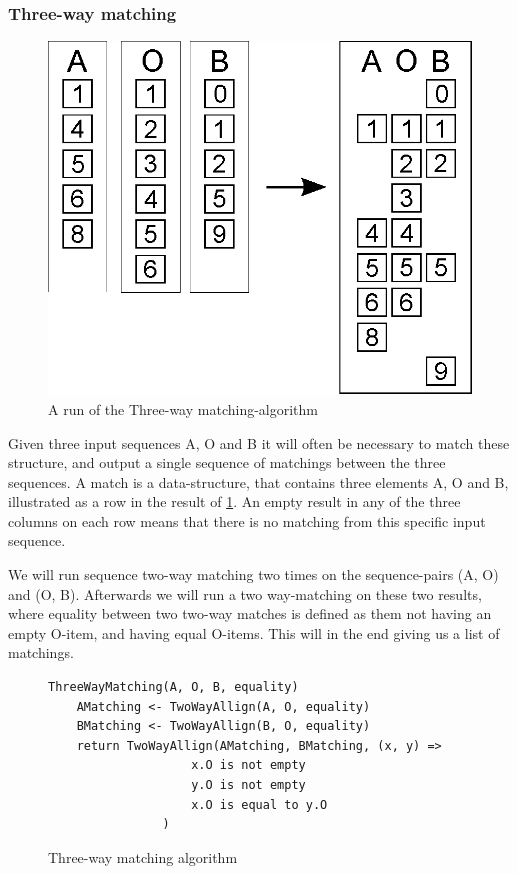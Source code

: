 \documentclass[11pt]{article}
\begin{document}
\subsubsection{Three-way matching}
\begin{figure}
	\label{ThreewayMatching}
	\includegraphics[scale=0.4]{drawings/eps/threewaymatching.eps}
	\caption{A run of the Three-way matching-algorithm}
\end{figure}

Given three input sequences A, O and B it will often be necessary to match these structure, and output a single sequence of matchings between the three sequences. A match is a data-structure, that contains three elements A, O and B, illustrated as a row in the result of \ref{ThreewayMatching}. An empty result in any of the three columns on each row means that there is no matching from this specific input sequence.

We will run sequence two-way matching two times on the sequence-pairs (A, O) and (O, B). Afterwards we will run a two way-matching on these two results, where equality between two two-way matches is defined as them not having an empty O-item, and having equal O-items. This will in the end giving us a list of matchings.

\begin{figure}
  \label{ThreeWayMatchingAlgorithm}
\begin{verbatim}
ThreeWayMatching(A, O, B, equality)
    AMatching <- TwoWayAllign(A, O, equality)
    BMatching <- TwoWayAllign(B, O, equality)
    return TwoWayAllign(AMatching, BMatching, (x, y) =>
                    x.O is not empty
                    y.O is not empty
                    x.O is equal to y.O
                )

\end{verbatim}
\caption{Three-way matching algorithm}
\end{figure}
\end{document}
